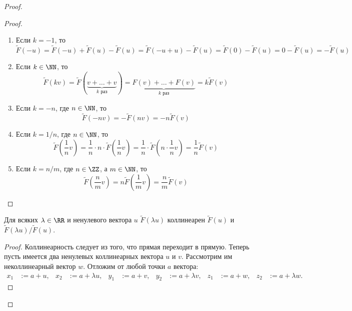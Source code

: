 \documentclass[12pt,a4paper]{article}
\begin{document}
\begin{proof}
        \begin{proof}
            \begin{enumerate}
                \item Если $k = -1$, то
                    \[
                        \widetilde{F}(-u)
                        = \widetilde{F}(-u) + \widetilde{F}(u) - \widetilde{F}(u)
                        = \widetilde{F}(-u + u) - \widetilde{F}(u)
                        = \widetilde{F}(0) - \widetilde{F}(u)
                        = 0 - \widetilde{F}(u)
                        = -\widetilde{F}(u)
                    \]
                \item Если $k \in \NN$, то
                    \[
                        \widetilde{F}(kv)
                        = \widetilde{F}(\underbrace{v + \dots + v}_{k \text{ раз}})
                        = \underbrace{F(v) + \dots + F(v)}_{k \text{ раз}}
                        = k \widetilde{F}(v)
                    \]
                \item Если $k = -n$, где $n \in \NN$, то
                    \[
                        \widetilde{F}(-nv)
                        = -\widetilde{F}(nv)
                        = -n\widetilde{F}(v)
                    \]
                \item Если $k = 1/n$, где $n \in \NN$, то
                    \[
                        \widetilde{F}\left(\frac{1}{n}v\right)
                        = \frac{1}{n} \cdot n \cdot \widetilde{F}\left(\frac{1}{n}v\right)
                        = \frac{1}{n} \cdot \widetilde{F}\left(n \cdot \frac{1}{n}v\right)
                        = \frac{1}{n} \widetilde{F}(v)
                    \]
                \item Если $k = n/m$, где $n \in \ZZ$, а $m \in \NN$, то
                    \[
                        \widetilde{F}\left(\frac{n}{m}v\right)
                        = n\widetilde{F}\left(\frac{1}{m}v\right)
                        = \frac{n}{m}\widetilde{F}(v)
                    \]
            \end{enumerate}
        \end{proof}

        \begin{thlemma}
            Для всяких $\lambda \in \RR$ и ненулевого вектора $u$ $\widetilde{F}(\lambda u)$ коллинеарен $\widetilde{F}(u)$ и $\widetilde{F}(\lambda u) / \widetilde{F}(u)$.
        \end{thlemma}

        \begin{proof}
            Коллинеарность следует из того, что прямая переходит в прямую. Теперь пусть имеется два ненулевых коллинеарных вектора $u$ и $v$. Рассмотрим им неколлинеарный вектор $w$. Отложим от любой точки $a$ вектора:
            \begin{align*}
                x_1 &:= a + u,&
                x_2 &:= a + \lambda u,&
                y_1 &:= a + v,&
                y_2 &:= a + \lambda v,&
                z_1 &:= a + w,&
                z_2 &:= a + \lambda w.
            \end{align*}


\end{proof}
\end{proof}
\end{document}
